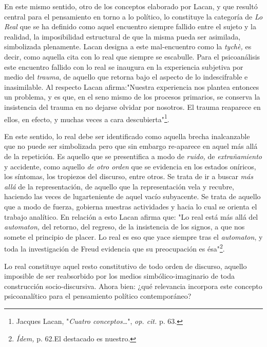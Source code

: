 \documentclass{book}
\begin{document}
En este mismo sentido, otro de los conceptos elaborado por Lacan, y que
resultó central para el pensamiento en torno a lo político, lo
constituye la categoría de \emph{Lo Real} que se ha definido como aquel
encuentro siempre fallido entre el sujeto y la realidad, la
imposibilidad estructural de que la misma pueda ser asimilada,
simbolizada plenamente. Lacan designa a este mal-encuentro como la
\emph{tychè,} es decir, como aquella cita con lo real que siempre se
escabulle. Para el psicoanálisis este encuentro fallido con lo real se
inaugura en la experiencia subjetiva por medio del \emph{trauma}, de
aquello que retorna bajo el aspecto de lo indescifrable e inasimilable.
Al respecto Lacan afirma:"Nuestra experiencia nos plantea entonces un
problema, y es que, en el seno mismo de los procesos primarios, se
conserva la insistencia del trauma en no dejarse olvidar por nosotros.
El trauma reaparece en ellos, en efecto, y muchas veces a cara
descubierta"\footnote{Jacques Lacan, "\emph{Cuatro conceptos\ldots{}}",
  \emph{op. cit.} p. 63.}.

En este sentido, lo real debe ser identificado como aquella brecha
inalcanzable que no puede ser simbolizada pero que sin embargo
re-aparece en aquel más allá de la repetición. Es aquello que se
presentifica a modo de \emph{ruido,} de \emph{extrañamiento} y
accidente, como aquello \emph{de otro orden} que se evidencia en los
estados oníricos, los síntomas, los tropiezos del discurso, entre otros.
Se trata de ir a buscar \emph{más allá} de la representación, de aquello
que la representación vela y recubre, haciendo las veces de
lugarteniente de aquel vacío subyacente. Se trata de aquello que a modo
de fuerza, gobierna nuestras actividades y hacia lo cual se orienta el
trabajo analítico. En relación a esto Lacan afirma que: "Lo real está
más allá del \emph{automaton,} del retorno, del regreso, de la
insistencia de los signos, a que nos somete el principio de placer. Lo
real es eso que yace siempre tras el \emph{automaton}, y toda la
investigación de Freud evidencia que su preocupación es ésa"\footnote{\emph{Ídem,}
  p. 62.El destacado es nuestro.}.

Lo real constituye aquel resto constitutivo de todo orden de discurso,
aquello imposible de ser reabsorbido por los medios simbólico-imaginario
de toda construcción socio-discursiva. Ahora bien: ¿qué relevancia
incorpora este concepto psicoanalítico para el pensamiento político
contemporáneo?
\end{document}
